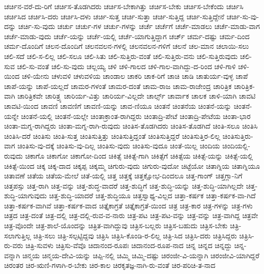 {ಚರ್ಚಿನ-ವರೆ-ದು-ರಿಗೆ
ಚರ್ಚಿಸ-ತೊಡಗಿದರು
ಚರ್ಚಿಸ-ಬೇಕಾಗಿತ್ತು
ಚರ್ಚಿಸ-ಬೇಕು
ಚರ್ಚಿಸ-ಬೇಕೆಂದು
ಚರ್ಚಿಸಿ
ಚರ್ಚಿಸಿದ
ಚರ್ಚಿಸಿ-ದರು
ಚರ್ಚಿಸಿ-ದಳು
ಚರ್ಚಿ-ಸುತ್ತ
ಚರ್ಚಿ-ಸುತ್ತಾ
ಚರ್ಚಿ-ಸುತ್ತಿದ್ದ
ಚರ್ಚಿ-ಸುತ್ತಿದ್ದೇನೆ
ಚರ್ಚಿ-ಸು-ವು-ದನ್ನು
ಚರ್ಚಿ-ಸು-ವುದು
ಚರ್ಚು
ಚರ್ಚು-ಗಳ
ಚರ್ಚು-ಗಳನ್ನು
ಚರ್ಚೆ
ಚರ್ಚೆಗೆ
ಚರ್ಚೆ-ಮಾಡಲು
ಚರ್ಚೆ-ಮಾಡು-ವಾಗ
ಚರ್ಚೆ-ಮಾಡು-ವುದು
ಚರ್ಚೆ-ಯನ್ನು
ಚರ್ಚೆ-ಯಲ್ಲಿ
ಚರ್ಚೆ-ಯಾಗುತ್ತಿದ್ದಾಗ
ಚರ್ಚ್
ಚರ್ಮ-ದಷ್ಟು
ಚರ್ಮ-ದಿಂದ
ಚರ್ಮ-ದೊಂದಿಗೆ
ಚಲನ-ದೊಂದಿಗೆ
ಚಲನವಲನ-ಗಳಲ್ಲಿ
ಚಲನವಲನ-ಗಳಿಗೆ
ಚಲನೆ
ಚಲ-ಮಾನ
ಚಲಾಯಿ-ಸಲು
ಚಲಿ-ಸದೆ
ಚಲಿ-ಸ-ಲಿಲ್ಲ
ಚಲಿ-ಸಲೂ
ಚಲಿ-ಸಿತು
ಚಲಿ-ಸುತ್ತಿರು-ವಂತೆ
ಚಲಿ-ಸುತ್ತಿರು-ವನು
ಚಲಿ-ಸುತ್ತಿರುವುದು
ಚಲಿ-ಸುವ
ಚಲಿ-ಸು-ವಂತೆ
ಚಲಿ-ಸು-ವುದು
ಚಲ್ಲಯ್ಯ
ಚಳಿ
ಚಳಿ-ಗಾಲದ
ಚಳಿ-ಗಾಲ-ವಾಗಿದ್ದು-ದ-ರಿಂದ
ಚಳಿ-ಗಾಳಿ
ಚಳಿ-ಯಿಂದ
ಚಳಿ-ಯೇನು
ಚಳುವಳಿ
ಚಳುವಳಿಯ
ಚಾಂಡಾಲ
ಚಾಕರಿ
ಚಾಕ-ರಿಗೆ
ಚಾಚಿ
ಚಾಡಿ
ಚಾತುರ್ಯ-ವುಳ್ಳ
ಚಾಪೆ
ಚಾಪೆ-ಯನ್ನು
ಚಾಪೆ-ಯಲ್ಲದೆ
ಚಾಮರ-ಗಳಂತೆ
ಚಾಮರ-ದಂತೆ
ಚಾಮ-ರಾಜ
ಚಾಮ-ರಾಜೇಂದ್ರ
ಚಾರಿತ್ರಿಕ
ಚಾರಿತ್ರಿಕ-ವಾಗಿ
ಚಾರಿತ್ರಿಕವೇ
ಚಾರಿತ್ರ್ಯ
ಚಾರಿರ್ಯ-ವಿತ್ತು
ಚಾರಿರ್ಯ-ವಿಲ್ಲದೇ
ಚಾರ್ಲ್ಸ್
ಚಾರ್ವಾಕ
ಚಾಲಕ
ಚಾಳಿ-ಯಾಗಿ
ಚಾವಟಿ
ಚಾವಟಿ-ಯಿಂದ
ಚಾವಣಿ
ಚಾವಣಿಗೆ
ಚಾವಣಿ-ಯನ್ನು
ಚಾವ-ಣಿಯೂ
ಚಿಂತನೆ
ಚಿಂತನೆಯ
ಚಿಂತನೆ-ಯನ್ನು
ಚಿಂತನೆ-ಯನ್ನೇ
ಚಿಂತನೆ-ಯಲ್ಲಿ
ಚಿಂತನೆ-ಯಲ್ಲೇ
ಚಿಂತಾಕ್ರಾಂತ-ರಾಗಿದ್ದರು
ಚಿಂತಾದ್ರಿ-ಪೇಟೆ
ಚಿಂತಾದ್ರಿ-ಪೇಟೆಯ
ಚಿಂತಾ-ಭಾರ
ಚಿಂತಾ-ಮಗ್ನ-ರಾಗಿದ್ದರು
ಚಿಂತಾ-ಮಗ್ನ-ರಾಗಿ-ರುವುದು
ಚಿಂತಿಸ-ತೊಡಗಿದರು
ಚಿಂತಿಸ-ತೊಡಗಿದೆ
ಚಿಂತಿ-ಸಲೂ
ಚಿಂತಿಸಿ
ಚಿಂತಿಸಿ-ದರೆ
ಚಿಂತಿಸು
ಚಿಂತಿ-ಸುತ್ತ
ಚಿಂತಿಸುತ್ತಿತ್ತು
ಚಿಂತಿಸುತ್ತಿದ್ದಂತೆ
ಚಿಂತಿಸುತ್ತಿದ್ದರೆ
ಚಿಂತಿಸುತ್ತಿರ-ಲಿಲ್ಲ
ಚಿಂತಿಸುತ್ತಿರು-ವಾಗ
ಚಿಂತಿಸು-ವು-ದಕ್ಕೆ
ಚಿಂತಿಸು-ವು-ದಿಲ್ಲ
ಚಿಂತಿಸು-ವುದು
ಚಿಂತಿಸು-ವುದೂ
ಚಿಂತೆ-ಯಿಲ್ಲ
ಚಿಂದಿಯ
ಚಿಂದಿಯಲ್ಲಿ-ರುವುದು
ಚಿಕಾಗೊ
ಚಿಕಾಗೋ
ಚಿಕಾಗೋ-ದಿಂದ
ಚಿಕಿತ್ಸೆ
ಚಿಕಿತ್ಸೆ-ಗಾಗಿ
ಚಿಕಿತ್ಸೆಗೆ
ಚಿಕಿತ್ಸೆಯ
ಚಿಕಿತ್ಸೆ-ಯನ್ನು
ಚಿಕಿತ್ಸೆ-ಯಲ್ಲಿ
ಚಿಕಿತ್ಸೆ-ಯಿಂದ
ಚಿಕ್ಕ
ಚಿಕ್ಕ-ದಾದ
ಚಿಕ್ಕಪ್ಪ
ಚಿಕ್ಕಮ್ಮ
ಚಿಗುರು-ವುದು
ಚಿಗುರು-ವುದೋ
ಚಿಟ್ಟೆಯೋ
ಚಿತಾಗ್ನಿಯ
ಚಿತಾಗ್ನಿಯೂ
ಚಿತಾವಣೆ
ಚಿತೆಯ
ಚಿತೆಯ-ಮೇಲೆ
ಚಿತೆ-ಯಲ್ಲಿ
ಚಿತ್ತ
ಚಿತ್ತಕ್ಕೆ
ಚಿತ್ತಕ್ಷೋಭ-ದಿಂದಲೂ
ಚಿತ್ತ-ಗಾಂಗ್
ಚಿತ್ತಗ್ಲಾ-ನಿಗೆ
ಚಿತ್ತಪಸ್ಸು
ಚಿತ್ತ-ರಾಗಿ
ಚಿತ್ತ-ವನ್ನು
ಚಿತ್ತ-ಶುದ್ಧ-ವಾದರೆ
ಚಿತ್ತ-ಶುದ್ಧಿಗೆ
ಚಿತ್ತ-ಶುದ್ಧಿ-ಯನ್ನು
ಚಿತ್ತ-ಶುದ್ಧಿ-ಯಾಗಿಲ್ಲದೇ
ಚಿತ್ತ-ಶುದ್ಧಿ-ಯಾಗುವುದು
ಚಿತ್ತ-ಶುದ್ಧಿ-ಯಾದರೆ
ಚಿತ್ತ-ಶುದ್ಧಿಯೂ
ಚಿತ್ತಸ್ವಾಥ್ಯ-ವಿಲ್ಲದ
ಚಿತ್ತಾ-ಕರ್ಷಕ
ಚಿತ್ತಾ-ಕರ್ಷಕ-ವಾ-ಗಿದೆ
ಚಿತ್ತಾ-ಕರ್ಷಕ-ವಾಗಿವೆ
ಚಿತ್ತಾ-ಕರ್ಷಕ-ವಾದ
ಚಿತ್ತೈಕಾಗ್ರತೆ
ಚಿತ್ತೈಕಾಗ್ರತೆ-ಯಿಂದ
ಚಿತ್ರ
ಚಿತ್ರ-ಕಾರ
ಚಿತ್ರ-ಗಳನ್ನು
ಚಿತ್ರ-ಗಳು
ಚಿತ್ರದ
ಚಿತ್ರ-ದಂತೆ
ಚಿತ್ರ-ದಲ್ಲಿ
ಚಿತ್ರ-ದಲ್ಲಿ-ರುವ-ವ-ನಾರು
ಚಿತ್ರ-ಪಟ
ಚಿತ್ರ-ಪಟ-ವನ್ನು
ಚಿತ್ರ-ವನ್ನು
ಚಿತ್ರ-ವಾಗಿದ್ದ
ಚಿತ್ರವೇ
ಚಿತ್ರ-ವೊಂದೇ
ಚಿತ್ರ-ಶಾಲೆ-ಯೊಂದನ್ನು
ಚಿತ್ರಿತ-ವಾಗಿದ್ದುವು
ಚಿತ್ರಿಸ-ಬಲ್ಲರು
ಚಿತ್ರಿಸ-ಬಹುದು
ಚಿತ್ರಿಸ-ಬೇಕು
ಚಿತ್ರಿ-ಸಲಾಗುತ್ತಿಲ್ಲ
ಚಿತ್ರಿ-ಸಲು
ಚಿತ್ರಿ-ಸಲ್ಪಟ್ಟಿದ್ದವು
ಚಿತ್ರಿಸಿ
ಚಿತ್ರಿಸಿ-ಕೊಂಡಿ-ರ-ಲಿಲ್ಲ
ಚಿತ್ರಿ-ಸಿದ
ಚಿತ್ರಿಸಿ-ದರು
ಚಿತ್ರಿಸಿದ್ದರು
ಚಿತ್ರಿಸಿ-ರು-ವರು
ಚಿತ್ರಿ-ಸುವಳು
ಚಿತ್ರಿಸು-ವೆವೊ
ಚಿದಾನಂದ-ರೂಪಃ
ಚಿದಾನಂದ-ರೂಪ-ನಾದ
ಚಿನ್ನ
ಚಿನ್ನದ
ಚಿನ್ನದ್ದು
ಚಿನ್ನ-ವನ್ನಾಗಿ
ಚಿನ್ಮಯ
ಚಿನ್ಮಯ-ದೇವಿ-ಯನ್ನು
ಚಿಪ್ಪಿ-ನಲ್ಲಿ
ಚಿಮ್ಮಿ
ಚಿಮ್ಮಿ-ದಷ್ಟು
ಚಿರಂಜೀ-ವಿ-ಯನ್ನಾಗಿ
ಚಿರಂಜೀವಿ-ಯಾಗಿದ್ದರೆ
ಚಿರಂತರ
ಚಿರ-ಋಣಿ-ಗಳಾಗಿ-ರ-ಬೇಕು
ಚಿರ-ಕಾಲ
ಚಿರಕೃತಜ್ಞ-ನಾಗಿ-ರು-ವಂತೆ
ಚಿರ-ಪರಿಚಿ-ತ-ನಾದ
}
